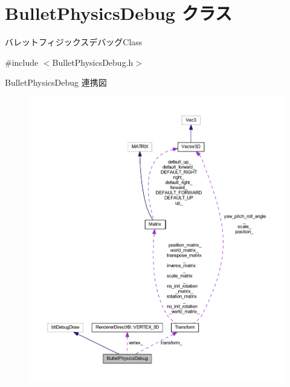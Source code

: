 \hypertarget{class_bullet_physics_debug}{}\section{Bullet\+Physics\+Debug クラス}
\label{class_bullet_physics_debug}


バレットフィジックスデバッグ\+Class  




{\ttfamily \#include $<$Bullet\+Physics\+Debug.\+h$>$}



Bullet\+Physics\+Debug 連携図\nopagebreak
\begin{figure}[H]
\begin{center}
\leavevmode
\includegraphics[width=350pt]{class_bullet_physics_debug__coll__graph}
\end{center}
\end{figure}
